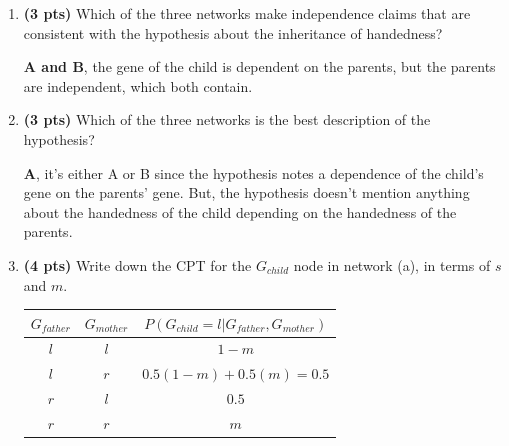 \documentclass{article}
\begin{document}
\begin{enumerate}
\begin{enumerate}[label=($\alph*$)]

    \item \textbf{(3 pts)} Which of the three networks make independence claims that are consistent with the hypothesis about the inheritance of handedness?

    \color{blue}
        \textbf{A and B}, the gene of the child is dependent on the parents, but the parents are independent, which both contain.
    \color{black}



    \item \textbf{(3 pts)} Which of the three networks is the best description of the hypothesis?

    \color{blue}
        \textbf{A}, it's either A or B since the hypothesis notes a dependence of the child's gene on the parents' gene. But, the hypothesis doesn't mention anything about the handedness of the child depending on the handedness of the parents.
    \color{black}



    \item \textbf{(4 pts)} Write down the CPT for the $G_{child}$ node in network (a), in terms of $s$ and $m$.

    \color{blue}
        \begin{tabular}{ |c c|c| } 
             \hline
             $G_{father}$ & $G_{mother}$ & $P(G_{child}=l|G_{father},G_{mother})$ \\
             \hline
             $l$ & $l$ & $1-m$ \\
             $l$ & $r$ & $0.5(1-m)+0.5(m)=0.5$ \\
             $r$ & $l$ & $0.5$ \\
             $r$ & $r$ & $m$ \\
             \hline
        \end{tabular}
    \color{black}



\end{enumerate}
\end{enumerate}
\end{document}
